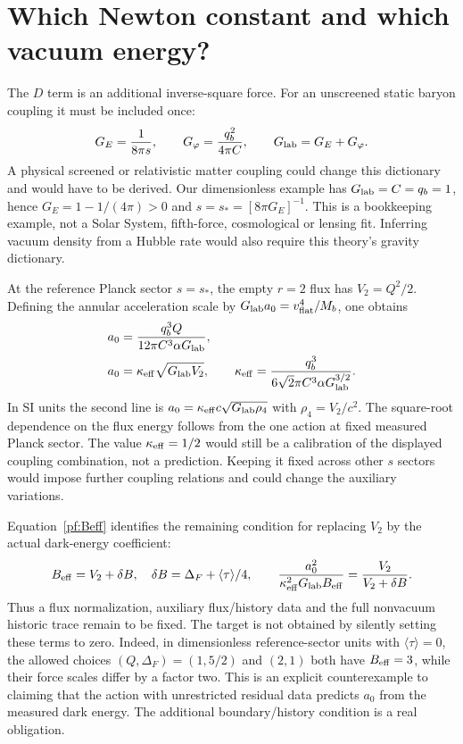 \documentclass[11pt]{article}
\begin{document}
\section{Which Newton constant and which vacuum energy?}
The $D$ term is an additional inverse-square force. For an unscreened
static baryon coupling it must be included once:
\begin{equation}
 G_E={1\over8\pi s},\qquad
 G_\varphi={q_b^2\over4\pi C},\qquad
 G_{\rm lab}=G_E+G_\varphi.
\end{equation}
A physical screened or relativistic matter coupling could change this
dictionary and would have to be derived. Our dimensionless example has
$G_{\rm lab}=C=q_b=1$, hence $G_E=1-1/(4\pi)>0$ and
$s=s_*=[8\pi G_E]^{-1}$. This is a bookkeeping example, not a Solar
System, fifth-force, cosmological or lensing fit. Inferring vacuum density
from a Hubble rate would also require this theory's gravity dictionary.

At the reference Planck sector $s=s_*$, the empty $r=2$ flux has
$V_2=Q^2/2$. Defining the annular acceleration scale by
$G_{\rm lab}a_0=v_{\rm flat}^4/M_b$, one obtains
\begin{align}
 a_0&={q_b^3Q\over12\pi C^3\alpha G_{\rm lab}},\\
 a_0&=\kappa_{\rm eff}\sqrt{G_{\rm lab}V_2},\qquad
 \kappa_{\rm eff}={q_b^3\over
                6\sqrt2\pi C^3\alpha G_{\rm lab}^{3/2}}.
 \label{pf:link}
\end{align}
In SI units the second line is
$a_0=\kappa_{\rm eff}c\sqrt{G_{\rm lab}\rho_4}$ with
$\rho_4=V_2/c^2$. The square-root dependence on the flux energy follows
from the one action at fixed measured Planck sector. The value
$\kappa_{\rm eff}=1/2$ would still be a calibration of the displayed
coupling combination, not a prediction. Keeping it fixed across other
$s$ sectors would impose further coupling relations and could change
the auxiliary variations.

Equation~\eqref{pf:Beff} identifies the remaining condition for replacing
$V_2$ by the actual dark-energy coefficient:
\begin{equation}
 B_{\rm eff}=V_2+\delta B,\quad
 \delta B=\Delta_F+\langle\tau\rangle/4,\qquad
 {a_0^2\over\kappa_{\rm eff}^2G_{\rm lab}B_{\rm eff}}
                   ={V_2\over V_2+\delta B}.
\end{equation}
Thus a flux normalization, auxiliary flux/history data and the full
nonvacuum historic trace remain to be fixed. The target is not obtained
by silently setting these terms to zero.
Indeed, in dimensionless reference-sector units with $\langle\tau\rangle=0$,
the allowed choices $(Q,\Delta_F)=(1,5/2)$ and $(2,1)$ both have
$B_{\rm eff}=3$, while their force scales differ by a factor two.
This is an explicit counterexample to claiming that the action with
unrestricted residual data predicts $a_0$ from the measured dark energy.
The additional boundary/history condition is a real obligation.
\end{document}
